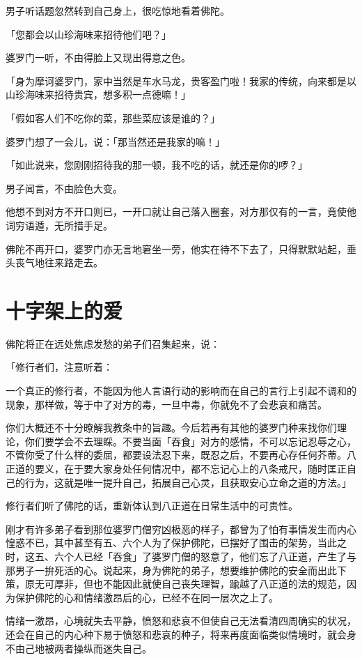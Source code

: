 \documentclass[twoside,openany]{book}
\begin{document}
男子听话题忽然转到自己身上，很吃惊地看着佛陀。

「您都会以山珍海味来招待他们吧？」

婆罗门一听，不由得脸上又现出得意之色。

「身为摩诃婆罗门，家中当然是车水马龙，贵客盈门啦！我家的传统，向来都是以山珍海味来招待贵宾，想多积一点德嘛！」

「假如客人们不吃你的菜，那些菜应该是谁的？」

婆罗门想了一会儿，说：「那当然还是我家的嘛！」

「如此说来，您刚刚招待我的那一顿，我不吃的话，就还是你的啰？」

男子闻言，不由脸色大变。

他想不到对方不开口则已，一开口就让自己落入圈套，对方那仅有的一言，竟使他词穷语遁，无所措手足。

佛陀不再开口，婆罗门亦无言地窘坐一旁，他实在待不下去了，只得默默站起，垂头丧气地往来路走去。

\section{十字架上的爱}\label{sec3.10}

佛陀将正在远处焦虑发愁的弟子们召集起来，说：

「修行者们，注意听着：

一个真正的修行者，不能因为他人言语行动的影响而在自己的言行上引起不调和的现象，那样做，等于中了对方的毒，一旦中毒，你就免不了会悲哀和痛苦。

你们大概还不十分暸解我教条中的旨趣。今后若再有其他的婆罗门种来找你们理论，你们要学会不去理睬。不要当面「吞食」对方的感情，不可以忘记忍辱之心，不管你受了什么样的委屈，都要设法忍下来，既忍之后，不要再心存任何芥蒂。八正道的要义，在于要大家身处任何情况中，都不忘记心上的八条戒尺，随时匡正自己的行为，这就是唯一提升自己，拓展自己心灵，且获取安心立命之道的方法。」

修行者们听了佛陀的话，重新体认到八正道在日常生活中的可贵性。

刚才有许多弟子看到那位婆罗门僧穷凶极恶的样子，都曾为了怕有事情发生而内心惶惑不已，其中甚至有五、六个人为了保护佛陀，已摆好了围击的架势，当此之时，这五、六个人已经「吞食」了婆罗门僧的怒意了，他们忘了八正道，产生了与那男子一拚死活的心。说起来，身为佛陀的弟子，想要维护佛陀的安全而出此下策，原无可厚非，但也不能因此就使自己丧失理智，踰越了八正道的法的规范，因为保护佛陀的心和情绪激昂后的心，已经不在同一层次之上了。

情绪一激昂，心境就失去平静，愤怒和悲哀不但使自己无法看清四周确实的状况，还会在自己的内心种下易于愤怒和悲哀的种子，将来再度面临类似情境时，就会身不由己地被两者操纵而迷失自己。
\end{document}
